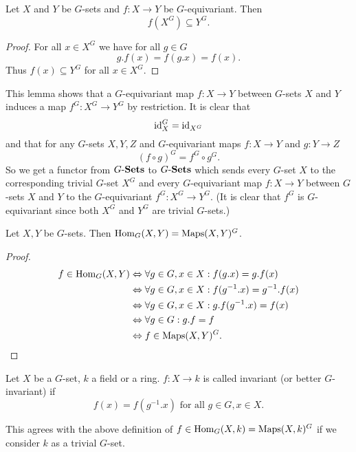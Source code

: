 \begin{lem}
 Let $X$ and $Y$ be $G$-sets and $f \colon X \to Y$ be $G$-equivariant. Then
 \[
  f(X^G) \subseteq Y^G.
 \]
\end{lem}
\begin{proof}
 For all $x \in X^G$ we have for all $g \in G$
 \[
  g.f(x) = f(g.x) = f(x).
 \]
 Thus $f(x) \subseteq Y^G$ for all $x \in X^G$.
\end{proof}


This lemma shows that a $G$-equivariant map $f \colon X \to Y$ between $G$-sets $X$ and $Y$ induces a map $f^G \colon X^G \to Y^G$ by restriction. It is clear that
\[
 \operatorname{id}_X^G = \operatorname{id}_{X^G}
\]
and that for any $G$-sets $X,Y,Z$ and $G$-equivariant maps $f \colon X \to Y$ and $g \colon Y \to Z$
\[
 (f \circ g)^G =  f^G \circ g^G.
\]
So we get a functor from $G\text{-}\mathbf{Sets}$ to $G\text{-}\mathbf{Sets}$ which sends every $G$-set $X$ to the corresponding trivial $G$-set $X^G$ and every $G$-equivariant map $f \colon X \to Y$ between $G$-sets $X$ and $Y$ to the $G$-equivariant $f^G \colon X^G \to Y^G$. (It is clear that $f^G$ is $G$-equivariant since both $X^G$ and $Y^G$ are trivial $G$-sets.)


\begin{lem}
 Let $X, Y$ be $G$-sets. Then $\operatorname{Hom}_G(X,Y) = \operatorname{Maps}(X,Y)^G$.
\end{lem}
\begin{proof}
 \begin{align*}
  f \in \operatorname{Hom}_G(X,Y)
  &\Leftrightarrow \forall g \in G, x \in X : f(g.x) = g.f(x) \\
  &\Leftrightarrow \forall g \in G, x \in X : f(g^{-1}.x) = g^{-1}.f(x) \\
  &\Leftrightarrow \forall g \in G, x \in X : g.f(g^{-1}.x) = f(x) \\
  &\Leftrightarrow \forall g \in G : g.f = f \\
  &\Leftrightarrow f \in \operatorname{Maps}(X,Y)^G.
 \end{align*}
\end{proof}


\begin{defi}
 Let $X$ be a $G$-set, $k$ a field or a ring. $f \colon X \to k$ is called invariant (or better $G$-invariant) if
 \[
  f(x) = f(g^{-1}.x) \text{ for all } g \in G, x \in X.
 \]
\end{defi}


\begin{note}
 This agrees with the above definition of $f \in \operatorname{Hom}_G(X,k) = \operatorname{Maps}(X,k)^G$ if we consider $k$ as a trivial $G$-set.
\end{note}


